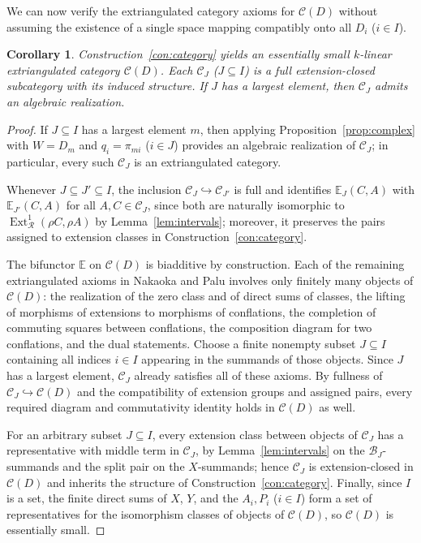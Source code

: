\documentclass[a4paper,reqno,10pt]{amsart}
\numberwithin{equation}{section}
\newtheorem{corollary}[theorem]{Corollary}
\theoremstyle{definition}
\newcommand{\B}{\mathcal B}
\newcommand{\C}{\mathcal C}
\newcommand{\E}{\mathbb E}
\newcommand{\Rcat}{\mathcal R}
\DeclareMathOperator{\Ext}{Ext}
\begin{document}
We can now verify the extriangulated category axioms for $\C(D)$ without
assuming the existence of a single space mapping compatibly onto all $D_i$
($i\in I$).

\begin{corollary}\label{cor:axioms}
Construction~\ref{con:category} yields an essentially small $k$-linear
extriangulated category $\C(D)$. Each $\C_J$ ($J\subseteq I$) is a full
extension-closed subcategory with its induced structure. If $J$ has a largest
element, then $\C_J$ admits an algebraic realization.
\end{corollary}
\begin{proof}
If $J\subseteq I$ has a largest element $m$, then applying
Proposition~\ref{prop:complex} with $W=D_m$ and $q_i=\pi_{mi}$ ($i\in J$)
provides an algebraic realization of $\C_J$; in particular, every such $\C_J$
is an extriangulated category.

Whenever $J\subseteq J'\subseteq I$, the inclusion $\C_J\hookrightarrow\C_{J'}$
is full and identifies $\E_J(C,A)$ with $\E_{J'}(C,A)$ for all $A,C\in\C_J$,
since both are naturally isomorphic to $\Ext^1_{\Rcat}(\rho C,\rho A)$ by
Lemma~\ref{lem:intervals}; moreover, it preserves the pairs assigned to
extension classes in Construction~\ref{con:category}.

The bifunctor $\E$ on $\C(D)$ is biadditive by construction. Each of the
remaining extriangulated axioms in Nakaoka and Palu \cite[Definition~2.12]{NP}
involves only finitely many objects of $\C(D)$: the realization of the zero
class and of direct sums of classes, the lifting of morphisms of extensions to
morphisms of conflations, the completion of commuting squares between
conflations, the composition diagram for two conflations, and the dual
statements. Choose a finite
nonempty subset $J\subseteq I$ containing all indices $i\in I$ appearing in the
summands of those objects. Since $J$ has a largest element, $\C_J$ already
satisfies all of these axioms. By fullness of $\C_J\hookrightarrow\C(D)$ and the
compatibility of extension groups and assigned pairs, every required diagram
and commutativity identity holds in $\C(D)$ as well.

For an arbitrary subset $J\subseteq I$, every extension class between objects
of $\C_J$ has a representative with middle term in $\C_J$, by
Lemma~\ref{lem:intervals} on the $\B_J$-summands and the split pair on the
$X$-summands; hence $\C_J$ is extension-closed in $\C(D)$ and inherits the
structure of Construction~\ref{con:category}. Finally, since $I$ is a set, the
finite direct sums of $X$, $Y$, and the $A_i,P_i$ ($i\in I$) form a set of
representatives for the isomorphism classes of objects of $\C(D)$, so $\C(D)$
is essentially small.
\end{proof}
\end{document}
